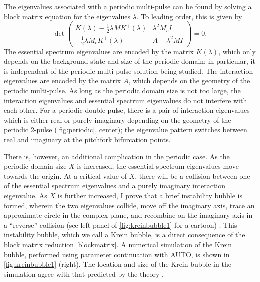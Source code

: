 \documentclass[12pt,reqno,oneside]{article}
\begin{document}
The eigenvalues associated with a periodic multi-pulse can be found by solving a block matrix equation \cite[Theorem 5.3]{ParkerKdV} for the eigenvalues $\lambda$. To leading order, this is given by
    \begin{equation}\label{blockmatrix}
    \det \begin{pmatrix}
    K(\lambda) - \frac{1}{2} \lambda \tilde{M} K^+(\lambda) & \lambda^2 M_c I \\
    -\frac{1}{2} \lambda M_c K^+(\lambda) & A - \lambda^2 MI  
    \end{pmatrix} = 0.
    \end{equation}
The essential spectrum eigenvalues are encoded by the matrix $K(\lambda)$, which only depends on the background state and size of the periodic domain; in particular, it is independent of the periodic multi-pulse solution being studied. The interaction eigenvalues are encoded by the matrix $A$, which depends on the geometry of the periodic multi-pulse. As long as the periodic domain size is not too large, the interaction eigenvalues and essential spectrum eigenvalues do not interfere with each other. For a periodic double pulse, there is a pair of interaction eigenvalues which is either real or purely imaginary depending on the geometry of the periodic 2-pulse (\cref{fig:periodic}, center); the eigenvalue pattern switches between real and imaginary at the pitchfork bifurcation points.  
    
There is, however, an additional complication in the periodic case. As the periodic domain size $X$ is increased, the essential spectrum eigenvalues move towards the origin. At a critical value of $X$,  there will be a collision between one of the essential spectrum eigenvalues and a purely imaginary interaction eigenvalue. As $X$ is further increased, I prove that a brief instability bubble is formed, wherein the two eigenvalues collide, move off the imaginary axis, trace an approximate circle in the complex plane, and recombine on the imaginary axis in a ``reverse'' collision (see left panel of \cref{fig:kreinbubble1} for a cartoon) \cite{ParkerKdV}. This instability bubble, which we call a Krein bubble, is a direct consequence of the block matrix reduction \cref{blockmatrix}. A numerical simulation of the Krein bubble, performed using parameter continuation with AUTO, is shown in \cref{fig:kreinbubble1} (right). The location and size of the Krein bubble in the simulation agree with that predicted by the theory \cite{ParkerKdV}.
    
\end{document}
